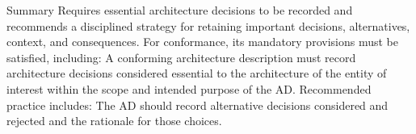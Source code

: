 \documentclass[10pt,letterpaper]{article}
\begin{document}
\begin{CornellSummaryBox}{Summary}
Requires essential architecture decisions to be recorded and recommends a disciplined strategy for retaining important decisions, alternatives, context, and consequences. For conformance, its mandatory provisions must be satisfied, including: A conforming architecture description must record architecture decisions considered essential to the architecture of the entity of interest within the scope and intended purpose of the AD. Recommended practice includes: The AD should record alternative decisions considered and rejected and the rationale for those choices.
\end{CornellSummaryBox}
\end{document}
